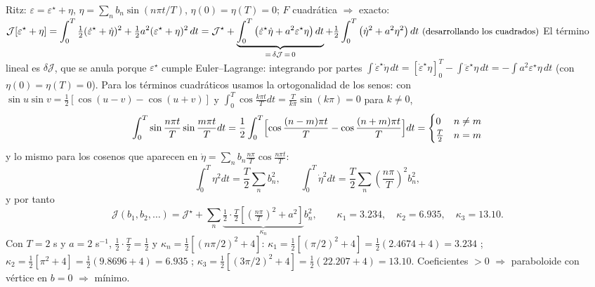 \documentclass[11pt,a4paper]{article}
\makeatletter
\numberwithin{equation}{section}
\renewcommand\paragraph{\@startsection{paragraph}{4}{\z@}{1.4ex plus .4ex}{-0.6em}%
  {\normalfont\color{tinta}}}
\makeatother
\begin{document}
\paragraph{Ritz:} $\varepsilon = \varepsilon^\star + \eta$, $\eta = \sum_nb_n\sin(n\pi t/T)$, $\eta(0) = \eta(T) = 0$; $F$ cuadrática $\Rightarrow$ exacto:
$\displaystyle \mathcal J[\varepsilon^\star + \eta]  = \int_0^T\tfrac12(\dot\varepsilon^\star + \dot\eta)^2 + \tfrac12a^2(\varepsilon^\star + \eta)^2\,dt = \mathcal J^\star + \underbrace{\int_0^T\left(\dot\varepsilon^\star\dot\eta + a^2\varepsilon^\star\eta\right)dt}_{=\,\delta\mathcal J\,=\,0} + \tfrac12\int_0^T\left(\dot\eta^2 + a^2\eta^2\right)dt \ \text{\small(desarrollando los cuadrados)}$
El término lineal es $\delta\mathcal J$, que se anula porque $\varepsilon^\star$ cumple Euler--Lagrange: integrando por partes $\int\dot\varepsilon^\star\dot\eta\,dt = [\dot\varepsilon^\star\eta]_0^T - \int\ddot\varepsilon^\star\eta\,dt = -\int a^2\varepsilon^\star\eta\,dt$ (con $\eta(0) = \eta(T) = 0$). Para los términos cuadráticos usamos la ortogonalidad de los senos: con $\sin u\sin v = \tfrac12[\cos(u - v) - \cos(u + v)]$ y $\int_0^T\cos\frac{k\pi t}{T}dt = \frac{T}{k\pi}\sin(k\pi) = 0$ para $k \ne 0$,
\[
\int_0^T\sin\frac{n\pi t}{T}\sin\frac{m\pi t}{T}dt = \frac12\int_0^T\Bigl[\cos\frac{(n - m)\pi t}{T} - \cos\frac{(n + m)\pi t}{T}\Bigr]dt = \begin{cases}0 & n \ne m\\ \frac T2 & n = m\end{cases}
\]
y lo mismo para los cosenos que aparecen en $\dot\eta = \sum_nb_n\frac{n\pi}{T}\cos\frac{n\pi t}{T}$:
\begin{equation*}
\int_0^T\eta^2dt = \frac T2\sum_nb_n^2,\qquad \int_0^T\dot\eta^2dt = \frac T2\sum_n\left(\frac{n\pi}{T}\right)^2b_n^2 ,
\end{equation*}
y por tanto
\begin{equation*}
\mathcal J(b_1, b_2, \dots) = \mathcal J^\star + \sum_n\underbrace{\tfrac12\cdot\tfrac T2\left[\left(\tfrac{n\pi}{T}\right)^2 + a^2\right]}_{\kappa_n}b_n^2,\qquad
\kappa_1 = 3.234,\quad \kappa_2 = 6.935,\quad \kappa_3 = 13.10 .
\end{equation*}
Con $T = 2$ s y $a = 2$ s$^{-1}$, $\tfrac12\cdot\tfrac T2 = \tfrac12$ y $\kappa_n = \tfrac12\left[(n\pi/2)^2 + 4\right]$:
$\kappa_1 = \tfrac12\left[(\pi/2)^2 + 4\right] = \tfrac12(2.4674 + 4) = 3.234$ ; $\kappa_2 = \tfrac12\left[\pi^2 + 4\right] = \tfrac12(9.8696 + 4) = 6.935$ ; $\kappa_3 = \tfrac12\left[(3\pi/2)^2 + 4\right] = \tfrac12(22.207 + 4) = 13.10$.
Coeficientes $> 0$ $\Rightarrow$ paraboloide con vértice en $b = 0$ $\Rightarrow$ mínimo.
\end{document}
